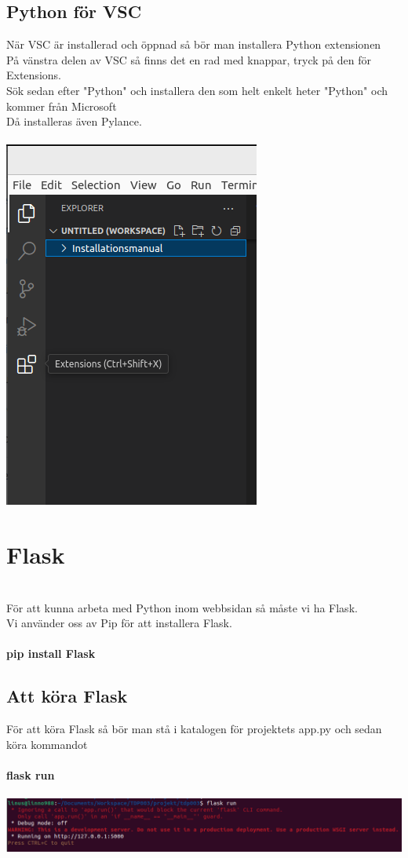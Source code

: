 \documentclass{TDP003mall}
\begin{document}
\subsection{Python för VSC}
När VSC är installerad och öppnad så bör man installera Python extensionen\\
På vänstra delen av VSC så finns det en rad med knappar, tryck på den för Extensions.\\
Sök sedan efter "Python" och installera den som helt enkelt heter "Python" och kommer från Microsoft\\
Då installeras även Pylance.\\\\
\includegraphics[scale=0.5]{extensions}


\section{Flask}\\
För att kunna arbeta med Python inom webbsidan så måste vi ha Flask.\\
Vi använder oss av Pip för att installera Flask.\\\\
\textbf{pip install Flask}\\
\subsection{Att köra Flask}
För att köra Flask så bör man stå i katalogen för projektets app.py och sedan köra kommandot\\\\
\textbf{flask run}\\\\
\includegraphics[scale=0.4]{flask_run}
\end{document}
